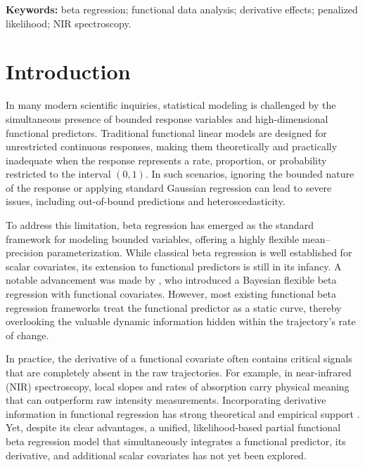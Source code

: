 \documentclass[twoside]{article}
\begin{document}
	\noindent\textbf{Keywords:} beta regression; functional data analysis; derivative effects; penalized likelihood; NIR spectroscopy.
	
\section{Introduction}

In many modern scientific inquiries, statistical modeling is challenged by the simultaneous presence of bounded response variables and high-dimensional functional predictors. Traditional functional linear models \citep{Cardot1999} are designed for unrestricted continuous responses, making them theoretically and practically inadequate when the response represents a rate, proportion, or probability restricted to the interval $(0, 1)$. In such scenarios, ignoring the bounded nature of the response or applying standard Gaussian regression can lead to severe issues, including out-of-bound predictions and heteroscedasticity.

To address this limitation, beta regression \citep{FerrariCribari2004} has emerged as the standard framework for modeling bounded variables, offering a highly flexible mean--precision parameterization. While classical beta regression is well established for scalar covariates, its extension to functional predictors is still in its infancy. A notable advancement was made by \citet{DiBrisco2023}, who introduced a Bayesian flexible beta regression with functional covariates. However, most existing functional beta regression frameworks treat the functional predictor as a static curve, thereby overlooking the valuable dynamic information hidden within the trajectory's rate of change.

In practice, the derivative of a functional covariate often contains critical signals that are completely absent in the raw trajectories. For example, in near-infrared (NIR) spectroscopy, local slopes and rates of absorption carry physical meaning that can outperform raw intensity measurements. Incorporating derivative information in functional regression has strong theoretical and empirical support \citep{HallHooker2016, HookerShang2020}. Yet, despite its clear advantages, a unified, likelihood-based partial functional beta regression model that simultaneously integrates a functional predictor, its derivative, and additional scalar covariates has not yet been explored.
\end{document}
